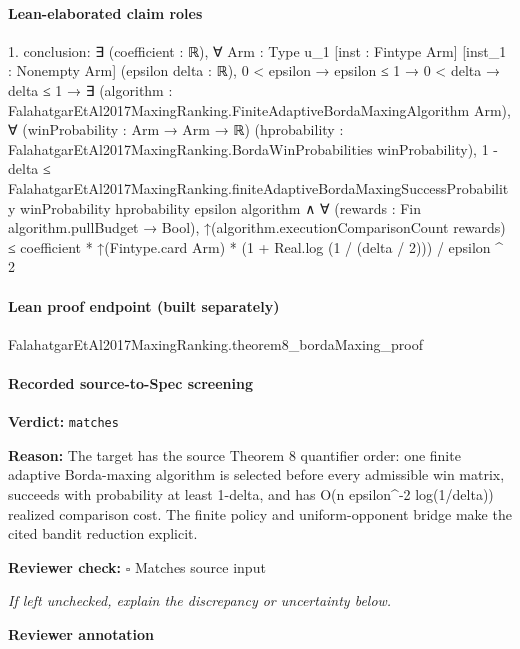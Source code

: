 \documentclass[10pt]{article}
\newcommand{\reviewerbox}{%
  \par\noindent\fbox{\parbox{0.96\linewidth}{\rule{0pt}{0.38in}}}\par
}
\newcommand{\reviewmatch}[1]{%
  \par\noindent\textbf{Reviewer check:} $\square$\; #1\par
  \noindent\emph{If left unchecked, explain the discrepancy or uncertainty below.}\par
}
\begin{document}
\paragraph{Lean-elaborated claim roles}\begin{ReviewVerbatim}
1. conclusion: ∃ (coefficient : ℝ),
  ∀ {Arm : Type u_1} [inst : Fintype Arm] [inst_1 : Nonempty Arm] (epsilon delta : ℝ),
    0 < epsilon →
      epsilon ≤ 1 →
        0 < delta →
          delta ≤ 1 →
            ∃ (algorithm : FalahatgarEtAl2017MaxingRanking.FiniteAdaptiveBordaMaxingAlgorithm Arm),
              ∀ (winProbability : Arm → Arm → ℝ)
                (hprobability : FalahatgarEtAl2017MaxingRanking.BordaWinProbabilities winProbability),
                1 - delta ≤
                    FalahatgarEtAl2017MaxingRanking.finiteAdaptiveBordaMaxingSuccessProbability winProbability
                      hprobability epsilon algorithm ∧
                  ∀ (rewards : Fin algorithm.pullBudget → Bool),
                    ↑(algorithm.executionComparisonCount rewards) ≤
                      coefficient * ↑(Fintype.card Arm) * (1 + Real.log (1 / (delta / 2))) / epsilon ^ 2
\end{ReviewVerbatim}

\paragraph{Lean proof endpoint (built separately)}\begin{ReviewVerbatim}
FalahatgarEtAl2017MaxingRanking.theorem8_bordaMaxing_proof
\end{ReviewVerbatim}

\paragraph{Recorded source-to-Spec screening}
\textbf{Verdict:} \texttt{matches}
\\
{\raggedright
\textbf{Reason:} The target has the source Theorem 8 quantifier order:\allowbreak{} one finite adaptive Borda-\allowbreak{}maxing algorithm is selected before every admissible win matrix, succeeds with probability at least 1-\allowbreak{}delta, and has O(n epsilon\textasciicircum{}-\allowbreak{}2 log(1/\allowbreak{}delta)) realized comparison cost.\allowbreak{} The finite policy and uniform-\allowbreak{}opponent bridge make the cited bandit reduction explicit.\allowbreak{}
\par}
\reviewmatch{Matches source input}
\noindent\textbf{Reviewer annotation}\par
\reviewerbox
\clearpage
\hypertarget{source-claim-3e26f4efead96be8}{}
\end{document}
